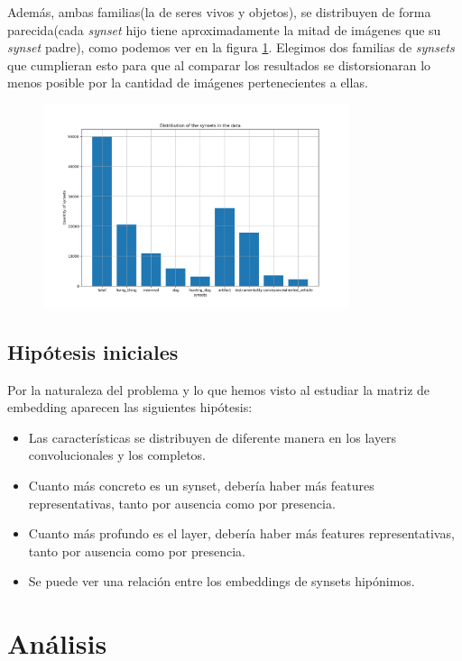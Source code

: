 \documentclass[12,twoside]{TFG-GM}
\theoremstyle{definition}
\theoremstyle{remark}
\begin{document}
Además, ambas familias(la de seres vivos y objetos), se distribuyen de forma parecida(cada \textit{synset} hijo tiene aproximadamente la mitad de imágenes que su \textit{synset} padre), como podemos ver en la figura \ref{fig:totalsynsets}. Elegimos dos familias de \textit{synsets} que cumplieran esto para que al comparar los resultados se distorsionaran lo menos posible por la cantidad de imágenes pertenecientes a ellas.

\begin{figure}[H] 
	\centering
	\includegraphics[width=0.8\textwidth] {Images/plots/25/distribution_of_synsets_bar.png}
	\caption{ 
	\label{fig:totalsynsets}}
\end{figure}


\subsection{Hipótesis iniciales}
Por la naturaleza del problema y lo que hemos visto al estudiar la matriz de embedding aparecen las siguientes hipótesis: 
\begin{itemize}
\item Las características se distribuyen de diferente manera en los layers convolucionales y los completos.

\item Cuanto más concreto es un synset, debería haber más features representativas, tanto por ausencia como por presencia.
\item Cuanto más profundo es el layer, debería haber más features representativas, tanto por ausencia como por presencia.
\item Se puede ver una relación entre los embeddings de synsets hipónimos.
\end{itemize}



\newpage
\section{Análisis}
\end{document}
